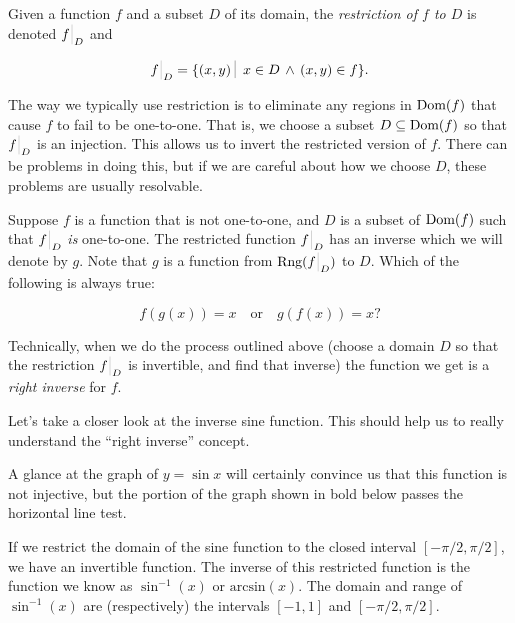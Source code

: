 \begin{defi}
Given a function $f$ and a subset $D$ of its domain, the
\emph{restriction of $f$ to $D$} is denoted $\restrict{f}{D}$ and

\[ \restrict{f}{D} = \{ (x,y) \suchthat \; x \in D \, \land \, (x,y) \in f \}. \]
\end{defi}

The way we typically use restriction is to eliminate any regions in
$\mbox{Dom}(f)$ that cause $f$ to fail to be one-to-one.   That is, we
choose a subset $D \subseteq \mbox{Dom}(f)$ so that $\restrict{f}{D}$ is an injection.
This allows us to invert the restricted version of $f$.  There can be
problems in doing this, but if we are careful about how we choose $D$,
these problems are usually resolvable.

\begin{exer}
Suppose $f$ is a function that is not one-to-one, and $D$ is a subset
of $\mbox{Dom}(f)$ such that $\restrict{f}{D}$ \emph{is} one-to-one.  The restricted
function $\restrict{f}{D}$ has an inverse which we will denote by $g$.  
Note that $g$ is a function from $\Rng{\restrict{f}{D}}$ to $D$.  Which
of the following is always true:

\[ f(g(x)) = x \quad \mbox{or} \quad g(f(x)) = x ? \]
\end{exer}

Technically, when we do the process outlined above (choose a domain
$D$ so that the restriction $\restrict{f}{D}$ is invertible, and 
find that inverse)
the function we get is a \emph{right inverse} for $f$.

Let's take a closer look at the inverse sine function.  This should 
help us to really understand the ``right inverse'' concept.  

A glance at the graph of $y = \sin{x}$ will certainly convince us that 
this function is not injective, but the portion of the graph shown 
in bold below passes the horizontal line test.

\begin{center}

\end{center}

If we restrict the domain of the sine function to the closed interval 
$[-\pi/2, \pi/2]$, we have an invertible function.  The inverse of this
restricted function is the function we know as $\sin^{-1}(x)$ or 
$\mbox{arcsin}(x)$.  The domain and range of $\sin^{-1}(x)$ are 
(respectively) the intervals
$[-1,1]$ and $[-\pi/2, \pi/2]$.  

